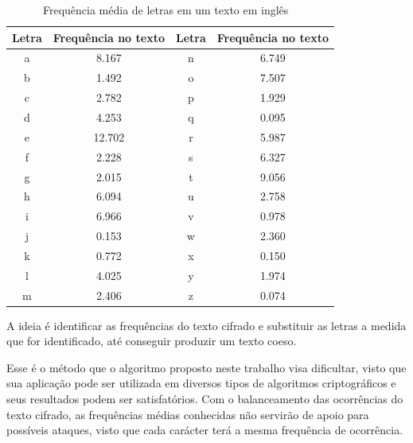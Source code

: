 \begin{table}[h]
\centering
\begin{tabular}{|c|c|c|c|}
	\hline
	Letra & Frequência no texto & Letra & Frequência no texto \\ \hline
	a & 8.167 & n & 6.749 \\ \hline
	b & 1.492 & o & 7.507 \\ \hline
	c & 2.782 & p & 1.929 \\ \hline
	d & 4.253 & q & 0.095 \\ \hline
	e & 12.702 & r & 5.987 \\ \hline
	f & 2.228 & s & 6.327 \\ \hline
	g & 2.015 & t & 9.056 \\ \hline
	h & 6.094 & u & 2.758 \\ \hline
	i & 6.966 & v & 0.978 \\ \hline
	j & 0.153 & w & 2.360 \\ \hline
	k & 0.772 & x & 0.150 \\ \hline
	l & 4.025 & y & 1.974 \\ \hline
	m & 2.406 & z & 0.074 \\ \hline
\end{tabular}
\caption[{Frequência média de letras em um texto em inglês}]{Frequência média de letras em um texto em inglês ~\cite{robert-lewand}} 
\end{table}

A ideia é identificar as frequências do texto cifrado e substituir as letras a medida que for identificado, até conseguir produzir um texto coeso.

Esse é o método que o algoritmo proposto neste trabalho visa dificultar, visto que sua aplicação pode ser utilizada em diversos tipos de algoritmos criptográficos e seus resultados podem ser satisfatórios. Com o balanceamento das ocorrências do texto cifrado, as frequências médias conhecidas não servirão de apoio para possíveis ataques, visto que cada carácter terá a mesma frequência de ocorrência.